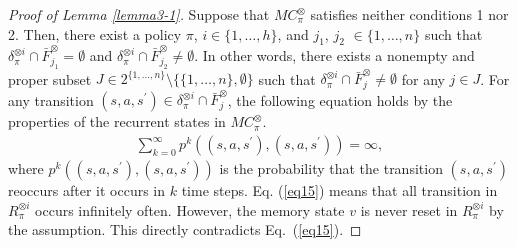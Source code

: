 \begin{proof}[Proof of Lemma \ref{lemma3-1}]
Suppose that $MC^{\otimes}_{\pi}$ satisfies neither conditions 1 nor 2. Then, there exist a policy $\pi$, $i \in \{ 1, \ldots ,h \}$, and $j_1$, $j_2$ $\in \{ 1, \ldots ,n \}$ such that $\delta^{\otimes i}_{\pi} \cap \bar{F}^{\otimes}_{j_1} = \emptyset$ and $\delta^{\otimes i}_{\pi} \cap \bar{F}^{\otimes}_{j_2} \neq \emptyset$. In other words, there exists a nonempty and proper subset $J \in 2^{\{ 1, \ldots ,n \}} \setminus \{ \{ 1, \ldots ,n \}, \emptyset \}$ such that $ \delta^{\otimes i}_{\pi} \cap \bar{F}^{\otimes}_j \neq \emptyset $ for any $j \in J$.
 For any transition $ (s,a,s^{\prime}) \in \delta^{\otimes i}_{\pi} \cap \bar{F}^{\otimes}_j$, the following equation holds by the properties of the recurrent states in $MC^{\otimes}_{\pi}$\cite{ESS}.
\begin{align}
  \sum_{k=0}^{\infty} p^k((s,a,s^{\prime}),(s,a,s^{\prime})) = \infty,
  \label{eq15}
\end{align}
where $p^k((s,a,s^{\prime}),(s,a,s^{ \prime}))$ is the probability that the transition $(s,a,s^{\prime})$ reoccurs after it occurs in $k$ time steps. Eq. (\ref{eq15}) means that all transition in $R^{\otimes i}_{\pi}$ occurs infinitely often. However, the memory state $v$ is never reset in $R^{\otimes i}_{\pi}$ by the assumption. This directly contradicts Eq.\ (\ref{eq15}).
\end{proof}
